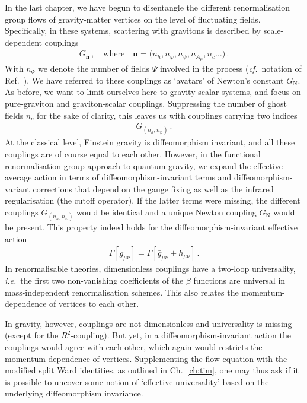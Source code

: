 \documentclass[11pt]{book}
\newcommand\GNewton{ G_{\scriptscriptstyle{\mathrm{N}}}{} }
\newcommand\ie{\textit{i.e.}\ }
\newcommand\cf{\textit{cf.}\ }
\numberwithin{equation}{chapter}
\begin{document}
In the last chapter, we have begun to disentangle the different renormalisation
group flows of gravity-matter vertices on the level of fluctuating fields.
Specifically, in these systems, scattering with gravitons is described
by scale-dependent couplings
\begin{align}
  G_{\mathbf{n}} \,,
  \quad \text{where} \quad
  \mathbf{n} = \big( n_h, n_\varphi, n_\psi, n_{A_\mu}, n_c \dots \big) \,.
\end{align}
With $n_{\Psi}$ we denote the number of fields $\Psi$ involved in
the process (\cf notation of Ref.~\cite{Meibohm:2016mkp}).
We have referred to these couplings as `avatars' of Newton's constant $\GNewton$.
As before, we want to limit ourselves here to gravity-scalar systems,
and focus on pure-graviton and graviton-scalar couplings.
Suppressing the number of ghost fields $n_c$ for the sake of clarity,
this leaves us with couplings carrying  two indices
\begin{align}
  G_{(n_h,n_\varphi)} \,.
\end{align}
At the classical level, Einstein gravity is diffeomorphism invariant,
and all these couplings are of course equal to each other.
However, in the functional renormalisation group approach to quantum gravity,
we expand the effective average action in
terms of diffeomorphism-invariant terms and diffeomorphism-variant
corrections that depend on the gauge fixing as well as the infrared
regularisation (the cutoff operator).
If the latter terms were missing, the different couplings $G_{(n_h,n_\varphi)}$
would be identical and a unique Newton coupling $\GNewton$ would be present.
This property indeed holds for the diffeomorphism-invariant effective action
\begin{align}
  \Gamma[g_{\mu\nu}] = \Gamma[\bar g_{\mu\nu} + h_{\mu\nu}] \,.
\end{align}
In renormalisable theories, dimensionless couplings have a two-loop universality,
\ie the first two non-vanishing coefficients of the $\beta$ functions are
universal in mass-independent renormalisation schemes.
This also relates the momentum-dependence of vertices to each other.

In gravity, however,
couplings are not dimensionless and universality is missing (except for the $R^2$-coupling).
But yet, in a diffeomorphism-invariant action the couplings would agree with each other,
which again would restricts the momentum-dependence of vertices.
Supplementing the flow equation with the modified split Ward identities, as outlined
in Ch.~\ref{ch:tim}, one may thus ask if it is possible to uncover some notion of `effective universality'
based on the underlying diffeomorphism invariance.
\end{document}
